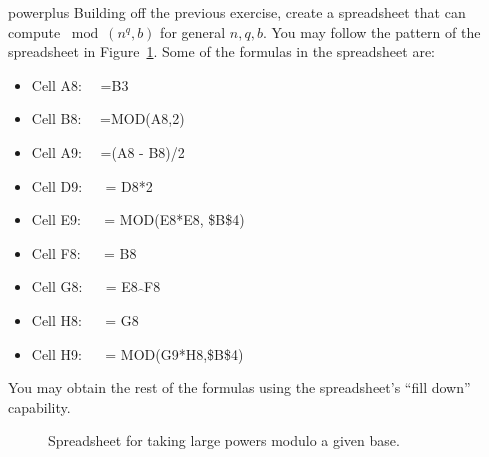 \begin{exercise}{powerplus}
Building off the previous exercise, create a spreadsheet that can compute $\bmod(n^{q},b)$ for general $n,q,b$.  You may follow the pattern of the spreadsheet in Figure~\ref{fig:LargePowMod}.  Some of the formulas in the spreadsheet are:
\begin{itemize}
\item
Cell A8: ~~=B3
\item
Cell B8: ~~=MOD(A8,2)
\item
Cell A9: ~~=(A8 - B8)/2
\item
Cell D9: ~~ = D8*2
\item
Cell E9: ~~ = MOD(E8*E8, \$B\$4)
\item
Cell F8: ~~ = B8
\item
Cell G8: ~~ = E8$\widehat{~~}$F8
\item
Cell H8: ~~ = G8
\item
Cell H9: ~~ = MOD(G9*H8,\$B\$4)
\end{itemize}
You may obtain the rest of the formulas using the spreadsheet's ``fill down'' capability.

\begin{figure}[h]
\caption{Spreadsheet for taking large powers modulo a given base.}
\label{fig:LargePowMod}
\end{figure}
\end{exercise} 


